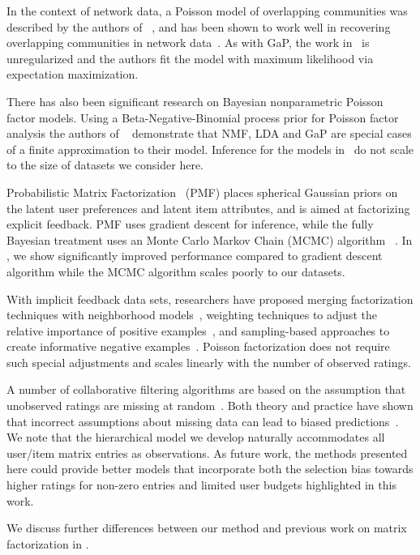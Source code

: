 In the context of network data, a Poisson model of overlapping
communities was described by the authors of ~\cite{Ball:2011}, and has
been shown to work well in recovering overlapping communities in
network data~\cite{Gopalan:2013}.  As with GaP, the work
in~\cite{Ball:2011} is unregularized and the authors fit the model
with maximum likelihood via expectation maximization.

There has also been significant research on Bayesian nonparametric
Poisson factor models. Using a Beta-Negative-Binomial process prior
for Poisson factor analysis the authors of ~\cite{Zhou:2012}
demonstrate that NMF, LDA and GaP are special cases of a finite
approximation to their model. Inference for the models
in~\cite{Zhou:2012} do not scale to the size of datasets we consider
here.

Probabilistic Matrix Factorization~\cite{Salakhutdinov:2008a} (PMF)
places spherical Gaussian priors on the latent user preferences and
latent item attributes, and is aimed at factorizing explicit feedback.
PMF uses gradient descent for inference, while the fully Bayesian
treatment uses an Monte Carlo Markov Chain (MCMC) algorithm
~\cite{Salakhutdinov:2008}.  In , we show significantly
improved performance compared to gradient descent algorithm while the
MCMC algorithm scales poorly to our datasets.

With implicit feedback data sets, researchers have proposed merging
factorization techniques with neighborhood models~\cite{Koren:2008},
weighting techniques to adjust the relative importance of positive
examples~\cite{Hu:2008p9402}, and sampling-based approaches to create
informative negative
examples~\cite{Gantner:2012p9364,Dror:2012a,Paquet:2013p9197}.
Poisson factorization does not require such special adjustments and
scales linearly with the number of observed ratings.


A number of collaborative filtering algorithms are based on the
assumption that unobserved ratings are missing at
random~\cite{Marlin:2012}. Both theory and practice have shown that
incorrect assumptions about missing data can lead to biased
predictions~\cite{Marlin:2009}. We note that the hierarchical model we
develop naturally accommodates all user/item matrix entries as
observations. As future work, the methods presented here could provide
better models that incorporate both the selection bias towards higher
ratings for non-zero entries and limited user budgets highlighted in
this work.

We discuss further differences between our method and previous work on
matrix factorization in .

